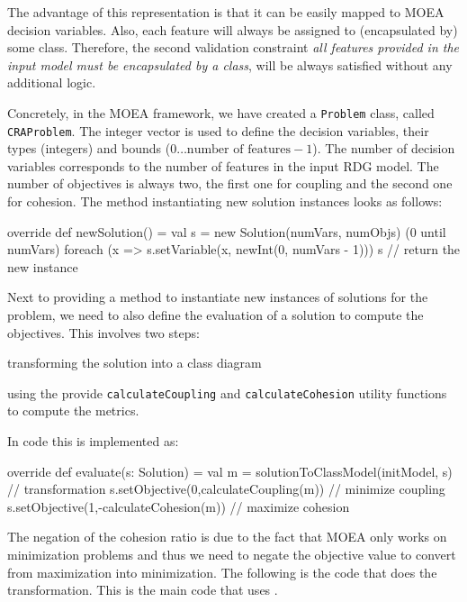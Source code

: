 The advantage of this representation is that it can be easily mapped to MOEA decision variables.
Also, each feature will always be assigned to (encapsulated by) some class.
Therefore, the second validation constraint \emph{all features provided in the input model must be encapsulated by a class}, will be always satisfied without any additional logic.

\enlargethispage{5mm}

Concretely, in the MOEA framework, we have created a \texttt{Problem} class, called \texttt{CRAProblem}.
The integer vector is used to define the decision variables, their types (\Ie integers) and bounds (\Ie $0\dots\text{number of features}-1$).
The number of decision variables corresponds to the number of features in the input RDG model.
The number of objectives is always two, the first one for coupling and the second one for cohesion.
The method instantiating new solution instances looks as follows:
%
\begin{scalacode}
override def newSolution() = {
  val s = new Solution(numVars, numObjs)
  (0 until numVars) foreach (x => s.setVariable(x, newInt(0, numVars - 1)))
  s // return the new instance
}
\end{scalacode}

Next to providing a method to instantiate new instances of solutions for the problem, we need to also define the evaluation of a solution to compute the objectives.
This involves two steps:
%
\begin{inparaenum}[(1)]
  \item transforming the solution into a class diagram
  \item using the provide \texttt{calculateCoupling} and \texttt{calculateCohesion} utility functions to compute the metrics.
\end{inparaenum}
%
In code this is implemented as:
%
\begin{scalacode}
override def evaluate(s: Solution) = {
  val m = solutionToClassModel(initModel, s) // transformation
  s.setObjective(0,calculateCoupling(m))     // minimize coupling
  s.setObjective(1,-calculateCohesion(m))    // maximize cohesion
}
\end{scalacode}
%
The negation of the cohesion ratio is due to the fact that MOEA only works on minimization problems and thus we need to negate the objective value to convert from maximization into minimization.
The following is the code that does the transformation.
This is the main code that uses \SIGMA.
%

